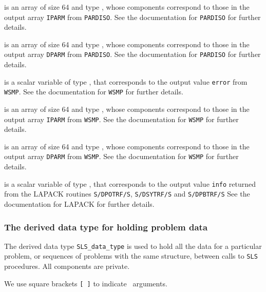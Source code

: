\documentclass{galahad}
\newcommand{\packagename}{SLS}
\begin{document}
\begin{description}
 is an array of size 64 and type \integer,
whose components correspond to those in the output array {\tt IPARM}
from {\tt PARDISO}. See the documentation for {\tt PARDISO} for further
details.

 is an array of size 64 and type \realdp,
whose components correspond to those in the output array {\tt DPARM}
from {\tt PARDISO}. See the documentation for {\tt PARDISO} for further
details.

 is a scalar variable of type \integer,
that corresponds to the output value {\tt error}
from {\tt WSMP}. See the documentation for {\tt WSMP} for further
details.

 is an array of size 64 and type \integer,
whose components correspond to those in the output array {\tt IPARM}
from {\tt WSMP}. See the documentation for {\tt WSMP} for further
details.

 is an array of size 64 and type \realdp,
whose components correspond to those in the output array {\tt DPARM}
from {\tt WSMP}. See the documentation for {\tt WSMP} for further
details.

 is a scalar variable of type \integer,
that corresponds to the output value {\tt info} returned from
the LAPACK routines {\tt S/DPOTRF/S},
{\tt S/DSYTRF/S} and {\tt S/DPBTRF/S}
See the documentation for LAPACK for further
details.

\end{description}



\subsubsection{The derived data type for holding problem data}\label{typedata}
The derived data type
{\tt \packagename\_data\_type}
is used to hold all the data for a particular problem,
or sequences of problems with the same structure, between calls to
{\tt \packagename} procedures.
All components are private.


\galarguments
We use square brackets {\tt [ ]} to indicate \optional\ arguments.

\end{document}

